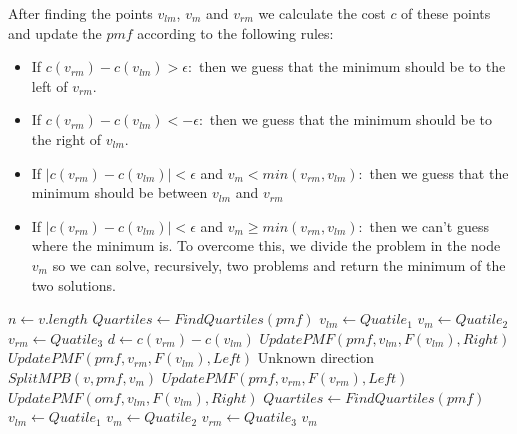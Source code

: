 \documentclass[12pt]{article}
\begin{document}
After finding the points $v_{lm}$, $v_m$ and $v_{rm}$ we calculate the cost $c$ of these points and update the $pmf$ according to the following rules:
\begin{itemize}
    \item{If $c (v_{rm}) - c (v_{lm}) > \epsilon:$} then we guess that the minimum should be to the left of $v_{rm}$.
    \item{If $c (v_{rm}) - c (v_{lm}) < -\epsilon:$} then we guess that the minimum should be to the right of $v_{lm}$.
    \item{If $|c (v_{rm}) - c (v_{lm})| < \epsilon$ and $v_m < {min (v_{rm}, v_{lm})}:$} then we guess that the minimum should be between $v_{lm}$ and $v_{rm}$
    \item{If $|c (v_{rm}) - c (v_{lm})| < \epsilon$ and $v_m \geq {min (v_{rm}, v_{lm})}:$} then we can't guess where the minimum is. To overcome this, we divide the problem in the node $v_m$ so we can solve, recursively, two problems and return the minimum of the two solutions.
\end{itemize}

\begin{algorithm}[h]
\caption{}
\begin{algorithmic}[1]
    \State $n \gets v.length$
    \State $Quartiles \gets FindQuartiles (pmf)$
    \State $v_{lm} \gets Quatile_1$
    \State $v_{m} \gets Quatile_2$
    \State $v_{rm} \gets Quatile_3$
        \State $d \gets c (v_{rm}) - c (v_{lm})$
                \State $UpdatePMF (pmf, v_{lm}, F (v_{lm}), Right)$
                \State $UpdatePMF (pmf, v_{rm}, F (v_{lm}), Left)$
             \Else \Comment Unknown direction
                \State
                \Return $SplitMPB (v, pmf, v_m)$
            \EndIf
                \State $UpdatePMF (pmf, v_{rm}, F (v_{rm}), Left)$
            \Else
                \State $UpdatePMF (omf, v_{lm}, F (v_{lm}), Right)$
        \EndIf
        \State $Quartiles \gets FindQuartiles (pmf)$
        \State $v_{lm} \gets Quatile_1$
        \State $v_{m} \gets Quatile_2$
        \State $v_{rm} \gets Quatile_3$
    \EndWhile
    \State
    \Return $v_m$
\EndProcedure
\end{algorithmic}
\end{algorithm}
\end{document}
